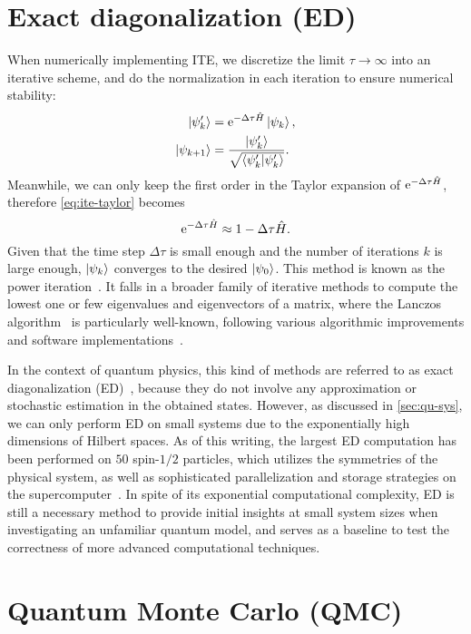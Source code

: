 \section{Exact diagonalization (ED)}

When numerically implementing ITE, we discretize the limit $\tau \to \infty$ into an iterative scheme, and do the normalization in each iteration to ensure numerical stability:
\begin{align}
\ket{\psi'_k} &= \rme^{-\Delta \tau \hat{H}} \ket{\psi_k}, \\
\ket{\psi_{k + 1}} &= \frac{\ket{\psi'_k}}{\sqrt{\ip{\psi'_k}}}.
\end{align}
Meanwhile, we can only keep the first order in the Taylor expansion of $\mathrm{e}^{-\Delta \tau \hat{H}}$, therefore \cref{eq:ite-taylor} becomes
\begin{equation}
\mathrm{e}^{-\Delta \tau \hat{H}} \approx 1 - \Delta \tau \hat{H}.
\end{equation}
Given that the time step $\Delta \tau$ is small enough and the number of iterations $k$ is large enough, $\ket{\psi_k}$ converges to the desired $\ket{\psi_0}$. This method is known as the power iteration~\cite{mises1929praktische}. It falls in a broader family of iterative methods to compute the lowest one or few eigenvalues and eigenvectors of a matrix, where the Lanczos algorithm~\cite{lanczos1950iteration} is particularly well-known, following various algorithmic improvements and software implementations~\cite{knyazev2001toward, stathopoulos2010primme}.

In the context of quantum physics, this kind of methods are referred to as exact diagonalization (ED)~\cite{weisse2008exact}, because they do not involve any approximation or stochastic estimation in the obtained states. However, as discussed in \cref{sec:qu-sys}, we can only perform ED on small systems due to the exponentially high dimensions of Hilbert spaces. As of this writing, the largest ED computation has been performed on $50$ spin-$1/2$ particles, which utilizes the symmetries of the physical system, as well as sophisticated parallelization and storage strategies on the supercomputer~\cite{wietek2018sublattice}. In spite of its exponential computational complexity, ED is still a necessary method to provide initial insights at small system sizes when investigating an unfamiliar quantum model, and serves as a baseline to test the correctness of more advanced computational techniques.

\section{Quantum Monte Carlo (QMC)}

